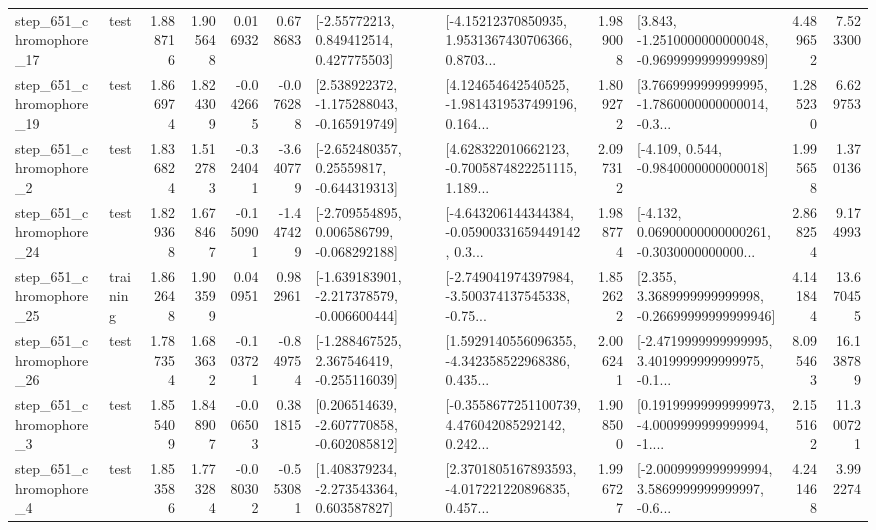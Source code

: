 \begin{tabular}{llrrrrllrlrr}
  step\_651\_chromophore\_17 &      test &      1.888716 &    1.905648 &      0.016932 &  0.678683 &     [-2.55772213, 0.849412514, 0.427775503] &  [-4.15212370850935, 1.9531367430706366, 0.8703... &       1.989008 &  [3.843, -1.2510000000000048, -0.9699999999999989] &            4.489652 &          7.523300 \\
  step\_651\_chromophore\_19 &      test &      1.866974 &    1.824309 &     -0.042665 & -0.076288 &   [2.538922372, -1.175288043, -0.165919749] &  [4.124654642540525, -1.9814319537499196, 0.164... &       1.809272 &  [3.7669999999999995, -1.7860000000000014, -0.3... &            1.285230 &          6.629753 \\
   step\_651\_chromophore\_2 &      test &      1.836824 &    1.512783 &     -0.324041 & -3.640779 &    [-2.652480357, 0.25559817, -0.644319313] &  [4.628322010662123, -0.7005874822251115, 1.189... &       2.097312 &               [-4.109, 0.544, -0.9840000000000018] &            1.995658 &          1.370136 \\
  step\_651\_chromophore\_24 &      test &      1.829368 &    1.678467 &     -0.150901 & -1.447429 &   [-2.709554895, 0.006586799, -0.068292188] &  [-4.643206144344384, -0.05900331659449142, 0.3... &       1.988774 &  [-4.132, 0.06900000000000261, -0.3030000000000... &            2.868254 &          9.174993 \\
  step\_651\_chromophore\_25 &  training &      1.862648 &    1.903599 &      0.040951 &  0.982961 &  [-1.639183901, -2.217378579, -0.006600444] &  [-2.749041974397984, -3.500374137545338, -0.75... &       1.852622 &  [2.355, 3.3689999999999998, -0.26699999999999946] &            4.141844 &         13.670455 \\
  step\_651\_chromophore\_26 &      test &      1.787354 &    1.683632 &     -0.103721 & -0.849754 &   [-1.288467525, 2.367546419, -0.255116039] &  [1.5929140556096355, -4.342358522968386, 0.435... &       2.006241 &  [-2.4719999999999995, 3.4019999999999975, -0.1... &            8.095463 &         16.138789 \\
   step\_651\_chromophore\_3 &      test &      1.855409 &    1.848907 &     -0.006503 &  0.381815 &   [0.206514639, -2.607770858, -0.602085812] &  [-0.3558677251100739, 4.476042085292142, 0.242... &       1.908500 &  [0.19199999999999973, -4.0009999999999994, -1.... &            2.155162 &         11.300721 \\
   step\_651\_chromophore\_4 &      test &      1.853586 &    1.773284 &     -0.080302 & -0.553081 &    [1.408379234, -2.273543364, 0.603587827] &  [2.3701805167893593, -4.017221220896835, 0.457... &       1.996727 &  [-2.0009999999999994, 3.5869999999999997, -0.6... &            4.241468 &          3.992274 \\

\end{tabular}
